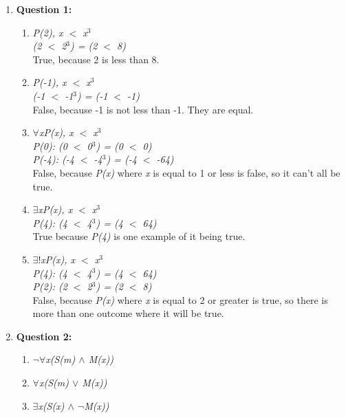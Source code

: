 \documentclass[11pt]{article}
\begin{document}
\begin{enumerate}

\item %
\textbf{Question 1:}
\begin{enumerate}[label=(\alph*)]
\item %
\textit {
P(2), x $<$ x$^{3}$ \\ 
(2 $<$ 2$^{3}$) = (2 $<$ 8) \\
}
True, because 2 is less than 8.

\item %
\textit {
P(-1), x $<$ x$^{3}$ \\
(-1 $<$ -1$^{3}$) = (-1 $<$ -1) \\
}
False, because -1 is not less than -1. They are equal.

\item %
\textit {
$\forall$xP(x), x $<$ x$^{3}$ \\
P(0): (0 $<$ 0$^{3}$) = (0 $<$ 0) \\
P(-4): (-4 $<$ -4$^{3}$) = (-4 $<$ -64) \\
}
False, because \textit{P(x)} where \textit{x} is equal to 1 or less is false, so it can't all be true.

\item %
\textit {
$\exists$xP(x), x $<$ x$^{3}$ \\
P(4): (4 $<$ 4$^{3}$) = (4 $<$ 64) \\
}
True because \textit{P(4)} is one example of it being true.

\item %
\textit{
$\exists!$xP(x), x $<$ x$^{3}$ \\
P(4): (4 $<$ 4$^{3}$) = (4 $<$ 64) \\
P(2): (2 $<$ 2$^{3}$) = (2 $<$ 8) \\
}
False, because \textit{P(x)} where \textit{x} is equal to 2 or greater is true, so there is more than one outcome where it will be true.
\end{enumerate}

\item %
\textbf{Question 2:}
\begin{enumerate}[label=(\alph*)]
\item %
\textit {$\lnot\forall$x(S(m) $\land$ M(x))}

\item %
\textit {$\forall$x(S(m) $\lor$ M(x))}

\item %
\textit {$\exists$x(S(x) $\land$ $\lnot$M(x))}
\end{enumerate}


\end{enumerate}
\end{document}

